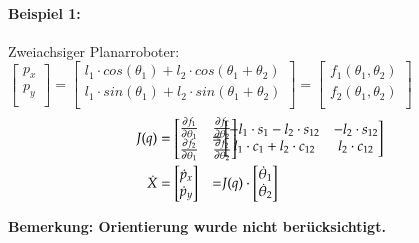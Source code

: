 \begin{minipage}{12cm}
    \paragraph{Beispiel 1:} Zweiachsiger Planarroboter: \\	
    $
    \begin{bmatrix} 
    p_x \\
    p_y \\                             
    \end{bmatrix}
    =
    \begin{bmatrix} 
    l_1\cdot cos(\theta_1) + l_2 \cdot cos(\theta_1 + \theta_2)\\
    l_1\cdot sin(\theta_1) + l_2 \cdot sin(\theta_1 + \theta_2)\\                     
    \end{bmatrix}
    =
    \begin{bmatrix} 
    f_1(\theta_1,\theta_2)\\
    f_2(\theta_1,\theta_2) \\                             
    \end{bmatrix}
    $ \\
    \vspace{-0.5cm}
    \begin{align*}
    J(q)&=
    \begin{bmatrix} 
    \frac{\partial f_1}{\partial \theta_1}  &   \frac{\partial f_1}{\partial \theta_2}\\
    \frac{\partial f_2}{\partial \theta_1} & \frac{\partial f_2}{\partial \theta_2}\\          
    \end{bmatrix}\hspace{-2cm}
    &=&
    \begin{bmatrix} 
    -l_1\cdot s_1 - l_2\cdot s_{12}& -l_2 \cdot s_{12} \\
    l_1\cdot c_1 + l_2 \cdot c_{12} & l_2 \cdot c_{12}\\                     
    \end{bmatrix}\\                    
    \dot{X}
    &=
    \begin{bmatrix} 
    \dot{p}_x \\
    \dot{p}_y \\                             
    \end{bmatrix}
    &=&
    J(q) \cdot         
    \begin{bmatrix} 
    \dot{\theta}_1 \\
    \dot{\theta}_2 \\                             
    \end{bmatrix}\\
    \end{align*}
    
    \vspace{-0.8cm}\textbf{\qquad Bemerkung: Orientierung wurde nicht berücksichtigt.}       
\end{minipage}        
